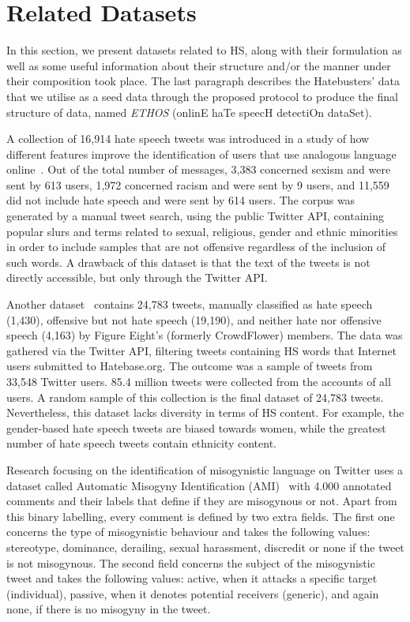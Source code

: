 \documentclass[sigconf]{acmart}
\begin{document}
\section{Related Datasets} 
In this section, we present datasets related to HS, along with their formulation as well as some useful information about their structure and/or the manner under their composition took place. The last paragraph describes the Hatebusters' data that we utilise as a seed data through the proposed protocol to produce the final structure of data, named {\em ETHOS} (onlinE haTe speecH detectiOn dataSet).

A collection of 16,914 hate speech tweets was introduced in a study of how different features improve the identification of users that use analogous language online~\cite{waseem-hovy}. Out of the total number of messages, 3,383 concerned sexism and were sent by 613 users, 1,972 concerned racism and were sent by 9 users, and 11,559 did not include hate speech and were sent by 614 users. The corpus was generated by a manual tweet search, using the public Twitter API, containing popular slurs and terms related to sexual, religious, gender and ethnic minorities in order to include samples that are not offensive regardless of the inclusion of such words. A drawback of this dataset is that the text of the tweets is not directly accessible, but only through the Twitter API.

Another dataset~\cite{hateTweets} contains 24,783 tweets, manually classified as hate speech (1,430), offensive but not hate speech (19,190), and neither hate nor offensive speech (4,163) by Figure Eight's (formerly CrowdFlower) members. The data was gathered via the Twitter API, filtering tweets containing HS words that Internet users submitted to Hatebase.org. The outcome was a sample of tweets from 33,548 Twitter users. 85.4 million tweets were collected from the accounts of all users. A random sample of this collection is the final dataset of 24,783 tweets. Nevertheless, this dataset lacks diversity in terms of HS content. For example, the gender-based hate speech tweets are biased towards women, while the greatest number of hate speech tweets contain ethnicity content.

Research focusing on the identification of misogynistic language on Twitter uses a dataset called Automatic Misogyny Identification (AMI)~\cite{fersini2018overview} with 4.000 annotated comments and their labels that define if they are misogynous or not. Apart from this binary labelling, every comment is defined by two extra fields. The first one concerns the type of misogynistic behaviour and takes the following values: stereotype, dominance, derailing, sexual harassment, discredit or none if the tweet is not misogynous. The second field concerns the subject of the misogynistic tweet and takes the following values: active, when it attacks a specific target (individual), passive, when it denotes potential receivers (generic), and again none, if there is no misogyny in the tweet.
\end{document}
